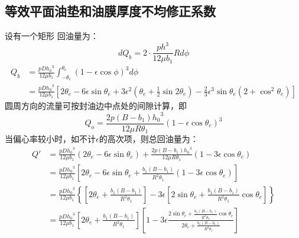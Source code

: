 \documentclass[UTF8, 12pt]{ctexbook}
\begin{document}
\subsection{等效平面油垫和油膜厚度不均修正系数}
设有一个矩形
回油量为：
\begin{equation*}
    dQ_b=2\cdot\frac{ph^3}{12\mu b_1}Rd\phi
\end{equation*}
\begin{equation*}
\begin{aligned}
    Q_b
    &=\frac{pD{h_0}^3}{12\mu b_1} 
        \int_{-\theta_e}^{\theta_e}(1-\epsilon\cos\phi)^3d\phi\\
    &=\frac{pD{h_0}^3}{12\mu b_1} 
        \left[
            2\theta_e 
            -6\epsilon\sin\theta_e 
            +3\epsilon^2(\theta_e+\frac{1}{2}\sin2\theta_e) 
            -\frac{2}{3}\epsilon^3\sin\theta_e(2+\cos^2\theta_e)
        \right]
\end{aligned}
\end{equation*}
圆周方向的流量可按封油边中点处的间隙计算，即
\begin{equation*}
    Q_o=\frac{2p(B-b_1){h_0}^3}{12\mu R\theta_1} 
        (1-\epsilon\cos\theta_e)^3
\end{equation*}
当偏心率较小时，如不计$\epsilon$的高次项，则总回油量为：
\begin{equation*}
\begin{aligned}
    Q'
    &=\frac{pD{h_0}^3}{12\mu b_1}
        (2\theta_e-6\epsilon\sin\theta_e)
        +\frac{2p(B-b_1){h_0}^3}{12\mu R\theta_1}
        (1-3\epsilon\cos\theta_e)\\
    &=\frac{pD{h_0}^3}{12\mu b_1}
        \left[
            2\theta_e-6\epsilon\sin\theta_e
            +\frac{b_1(B-b_1)}{R^2\theta_1}(1-3\epsilon\cos\theta_e)
        \right]\\
    &=\frac{pD{h_0}^3}{12\mu b_1}
        \left\{
            \left[
                2\theta_e+\frac{b_1(B-b_1)}{R^2\theta_1}
            \right]
            -3\epsilon
            \left[
                2\sin\theta_e+\frac{b_1(B-b_1)}{R^2\theta_1}\cos\theta_e
            \right]
        \right\}\\
    &=\frac{pD{h_0}^3}{12\mu b_1}
        \left[
            2\theta_e+\frac{b_1(B-b_1)}{R^2\theta_1}
        \right]
        \left[
            1-3\epsilon\frac{
                    2\sin\theta_e+\frac{b_1(B-b_1)}{R^2\theta_1}\cos\theta_e
                }{
                    2\theta_e+\frac{b_1(B-b_1)}{R^2\theta_1}
                }
        \right]
\end{aligned}
\end{equation*}
\end{document}
